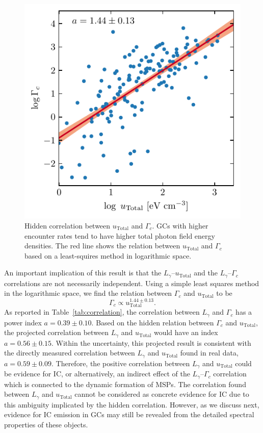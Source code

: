 \documentclass[doublespace,draft,nopageskip]{VTthesis} %
\begin{document}
\begin{figure}
    \centering
    \includegraphics[width=\columnwidth]{Figures/Globular/hidden.pdf}
    \caption{Hidden correlation between $u_\mathrm{Total}$ and $\Gamma_c$. GCs with higher encounter rates tend to have higher total photon field energy densities. The red line shows the relation between $u_\mathrm{Total}$ and $\Gamma_c$ based on a least-squires method in logarithmic space.}
    \label{fig:hidden_0}
\end{figure}

An important implication of this result is that the $L_\gamma$--$u_\mathrm{Total}$ and the $L_\gamma$--$\Gamma_c$ correlations are not necessarily independent. Using a simple least squares method in the logarithmic space, we find the relation between $\Gamma_c$ and $u_\mathrm{Total}$ to be
\begin{equation}
    \Gamma_c \propto u_\mathrm{Total}^{1.44 \pm 0.13}.
\end{equation}
As reported in Table~\ref{tab:correlation}, the correlation between $L_\gamma$ and $\Gamma_c$ has a power index $a=0.39 \pm 0.10$. Based on the hidden relation between $\Gamma_c$ and $u_\mathrm{Total}$, the projected correlation between $L_\gamma$ and $u_\mathrm{Total}$ would have an index $a = 0.56 \pm 0.15$. Within the uncertainty, this projected result is consistent with the directly measured correlation between $L_\gamma$ and $u_\mathrm{Total}$ found in real data, $a = 0.59 \pm 0.09$. Therefore, the positive correlation between $L_\gamma$ and $u_\mathrm{Total}$ could be evidence for IC, or alternatively, an indirect effect of the $L_\gamma$--$\Gamma_c$ correlation which is connected to the dynamic formation of MSPs. The correlation found between $L_\gamma$ and $u_\mathrm{Total}$ cannot be considered as concrete evidence for IC due to this ambiguity implicated by the hidden correlation. However, as we discuss next, evidence for IC emission in GCs may still be revealed from the detailed spectral properties of these objects.
\end{document}
